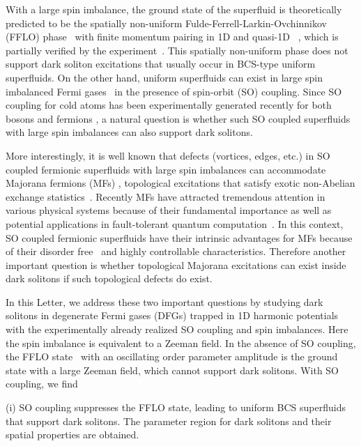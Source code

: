 \documentclass[prl,aps,twocolumn,showpacs, floatfix]{revtex4}
\begin{document}
With a large spin imbalance, the ground state of the superfluid is
theoretically predicted to be the spatially non-uniform
Fulde-Ferrell-Larkin-Ovchinnikov (FFLO) phase~\cite{FFLOlit} with finite
momentum pairing in 1D and quasi-1D~\cite%
{Yoshida2007PRA,HuHui2007PRA,Parish2007PRL,Roman2011PRA,Kuei2012PRA,Xiwen2013RMP}%
, which is partially verified by the experiment~\cite{Hulet2010Nature}. This
spatially non-uniform phase does not support dark soliton excitations that
usually occur in BCS-type uniform superfluids. On the other hand, uniform
superfluids can exist in large spin imbalanced Fermi gases~\cite{QuArxiv} in
the presence of spin-orbit (SO) coupling. Since SO coupling for cold atoms
has been experimentally generated recently for both bosons and fermions \cite%
{Lin2011Nature,Jing2012PRL,Zwierlen2012PRL,PanJian2012PRL,
Qu2013PRA,Spilman2013PRL}, a natural question is whether such SO coupled
superfluids with large spin imbalances can also support dark solitons.

More interestingly, it is well known that defects (vortices, edges, etc.) in
SO coupled fermionic superfluids with large spin imbalances can accommodate
Majorana fermions (MFs) \cite{Zhang2008PRL,Sato2009PRL,ShiLiang2011PRL,
LJiang2011PRL,XJLiu2012PRA,Melo2012PRL}, topological excitations that
satisfy exotic non-Abelian exchange statistics~\cite{Sarma2008RMP}. Recently
MFs have attracted tremendous attention in various physical systems \cite%
{MFSystem} because of their fundamental importance as well as potential
applications in fault-tolerant quantum computation~\cite{Kitaev2003AP}. In
this context, SO coupled fermionic superfluids have their intrinsic
advantages for MFs because of their disorder free~\cite{Liu2012PRL} and
highly controllable characteristics. Therefore another important question is
whether topological Majorana excitations can exist inside dark solitons if
such topological defects do exist.

In this Letter, we address these two important questions by studying dark
solitons in degenerate Fermi gases (DFGs) trapped in 1D harmonic potentials
with the experimentally already realized SO coupling and spin imbalances.
Here the spin imbalance is equivalent to a Zeeman field. In the absence of
SO coupling, the FFLO state~\cite{FFLOlit} with an oscillating order
parameter amplitude is the ground state \cite{HuHui2007PRA} with a large
Zeeman field, which cannot support dark solitons. With SO coupling, we find

(i) SO coupling suppresses the FFLO state, leading to uniform BCS
superfluids that support dark solitons. The parameter region for dark
solitons and their spatial properties are obtained.
\end{document}
